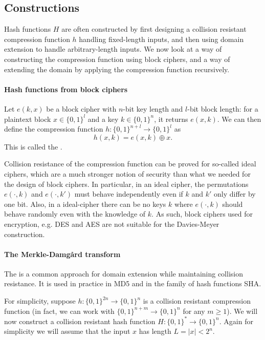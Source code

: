 \documentclass[a4paper, 11pt, openany]{book}
\begin{document}
\subsection{Constructions}

Hash functions $H$ are often constructed by first designing a collision resistant compression function $h$ handling fixed-length inputs, and then using domain extension to handle arbitrary-length inputs. We now look at a way of constructing the compression function using block ciphers, and a way of extending the domain by applying the compression function recursively.

\paragraph{Hash functions from block ciphers}

Let $e(k,x)$ be a block cipher with $n$-bit key length and $l$-bit block length: for a plaintext block $x \in \{0,1\}^l$ and a key $k \in \{0,1\}^n$, it returns $e(x,k)$. We can then define the compression function $h : \{0,1\}^{n + l} \to \{0,1\}^l$ as
\[
    h(x,k) = e(x,k) \oplus x.
\]
This is called the .

Collision resistance of the compression function can be proved for so-called ideal ciphers, which are a much stronger notion of security than what we needed for the design of block ciphers. In particular, in an ideal cipher, the permutations $e(\cdot,k)$ and $e(\cdot,k')$ must behave independently even if $k$ and $k'$ only differ by one bit. Also, in a ideal-cipher there can be no keys $k$ where $e(\cdot,k)$ should behave randomly even with the knowledge of $k$. As such, block ciphers used for encryption, e.g. DES and AES are not suitable for the Davies-Meyer construction.

\paragraph{The Merkle-Damg\aa{}rd transform}

The  is a common approach for domain extension while maintaining collision resistance. It is used in practice in MD5 and in the family of hash functions SHA.

For simplicity, suppose $h : \{0,1\}^{2n} \to \{0,1\}^n$ is a collision resistant compression function (in fact, we can work with $\{0,1\}^{n+m} \to \{0,1\}^n$ for any $m \ge 1$). We will now construct a collision resistant hash function $H : \{0,1\}^* \to \{0,1\}^n$. Again for simplicity we will assume that the input $x$ has length $L = |x| < 2^n$.
\end{document}

